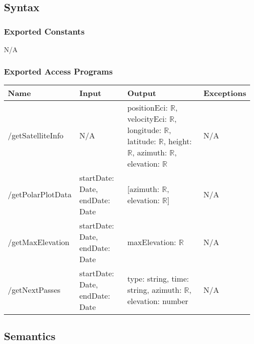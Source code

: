 \documentclass[12pt, titlepage]{article}
\begin{document}
\subsection{Syntax}

\subsubsection{Exported Constants}

N/A

\subsubsection{Exported Access Programs}

\begin{center}
\begin{tabular}{|p{4cm} |p{3cm} |p{5cm} |p{4cm}|}
\hline
\textbf{Name} & \textbf{Input} & \textbf{Output} & \textbf{Exceptions} \\
\hline
/getSatelliteInfo & N/A & positionEci: $\mathbb{R}$,
 velocityEci: $\mathbb{R}$,
longitude: $\mathbb{R}$,
latitude: $\mathbb{R}$,
height: $\mathbb{R}$,
azimuth: $\mathbb{R}$,
elevation: $\mathbb{R}$ & N/A \\
\hline
/getPolarPlotData & startDate: Date, endDate: Date & [azimuth: $\mathbb{R}$, elevation: $\mathbb{R}$] & N/A \\
\hline
/getMaxElevation & startDate: Date, endDate: Date & maxElevation: $\mathbb{R}$ & N/A \\
\hline
/getNextPasses & startDate: Date, endDate: Date & type: string, time: string, azimuth: $\mathbb{R}$, elevation: number & N/A \\
\hline

\end{tabular}

\end{center}

\subsection{Semantics}


 
\end{document}
